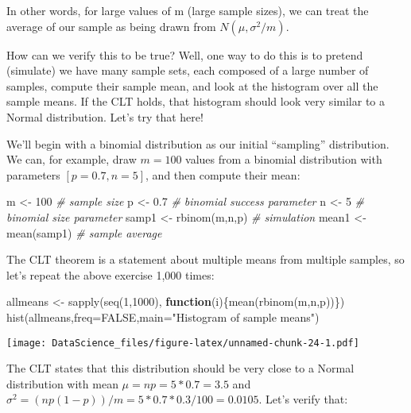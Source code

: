 \documentclass[
]{book}
\newenvironment{Shaded}{\begin{snugshade}}{\end{snugshade}}
\newcommand{\AttributeTok}[1]{\textcolor[rgb]{0.77,0.63,0.00}{#1}}
\newcommand{\CommentTok}[1]{\textcolor[rgb]{0.56,0.35,0.01}{\textit{#1}}}
\newcommand{\ConstantTok}[1]{\textcolor[rgb]{0.00,0.00,0.00}{#1}}
\newcommand{\ControlFlowTok}[1]{\textcolor[rgb]{0.13,0.29,0.53}{\textbf{#1}}}
\newcommand{\DecValTok}[1]{\textcolor[rgb]{0.00,0.00,0.81}{#1}}
\newcommand{\FloatTok}[1]{\textcolor[rgb]{0.00,0.00,0.81}{#1}}
\newcommand{\FunctionTok}[1]{\textcolor[rgb]{0.00,0.00,0.00}{#1}}
\newcommand{\NormalTok}[1]{#1}
\newcommand{\OtherTok}[1]{\textcolor[rgb]{0.56,0.35,0.01}{#1}}
\newcommand{\StringTok}[1]{\textcolor[rgb]{0.31,0.60,0.02}{#1}}
\begin{document}
In other words, for large values of m (large sample sizes), we can treat the average of our sample as being drawn from \(N(\mu,\sigma^2/m)\).

How can we verify this to be true? Well, one way to do this is to pretend (simulate) we have many sample sets, each composed of a large number of samples, compute their sample mean, and look at the histogram over all the sample means. If the CLT holds, that histogram should look very similar to a Normal distribution. Let's try that here!

We'll begin with a binomial distribution as our initial ``sampling'' distribution. We can, for example, draw \(m=100\) values from a binomial distribution with parameters \([p=0.7,n=5]\), and then compute their mean:

\begin{Shaded}
\begin{Highlighting}[]
\NormalTok{m }\OtherTok{\textless{}{-}} \DecValTok{100} \CommentTok{\# sample size}
\NormalTok{p }\OtherTok{\textless{}{-}} \FloatTok{0.7} \CommentTok{\# binomial success parameter}
\NormalTok{n }\OtherTok{\textless{}{-}} \DecValTok{5} \CommentTok{\# binomial size parameter}
\NormalTok{samp1 }\OtherTok{\textless{}{-}} \FunctionTok{rbinom}\NormalTok{(m,n,p)  }\CommentTok{\# simulation}
\NormalTok{mean1 }\OtherTok{\textless{}{-}} \FunctionTok{mean}\NormalTok{(samp1) }\CommentTok{\# sample average}
\end{Highlighting}
\end{Shaded}

The CLT theorem is a statement about multiple means from multiple samples, so let's repeat the above exercise 1,000 times:

\begin{Shaded}
\begin{Highlighting}[]
\NormalTok{allmeans }\OtherTok{\textless{}{-}} \FunctionTok{sapply}\NormalTok{(}\FunctionTok{seq}\NormalTok{(}\DecValTok{1}\NormalTok{,}\DecValTok{1000}\NormalTok{), }\ControlFlowTok{function}\NormalTok{(i)\{}\FunctionTok{mean}\NormalTok{(}\FunctionTok{rbinom}\NormalTok{(m,n,p))\})}
\FunctionTok{hist}\NormalTok{(allmeans,}\AttributeTok{freq=}\ConstantTok{FALSE}\NormalTok{,}\AttributeTok{main=}\StringTok{"Histogram of sample means"}\NormalTok{)}
\end{Highlighting}
\end{Shaded}

\texttt{[image: DataScience\_files/figure-latex/unnamed-chunk-24-1.pdf]}

The CLT states that this distribution should be very close to a Normal distribution with mean \(\mu = np = 5*0.7 = 3.5\) and \(\sigma^2 = (np(1-p))/m = 5*0.7*0.3/100 = 0.0105\). Let's verify that:
\end{document}
